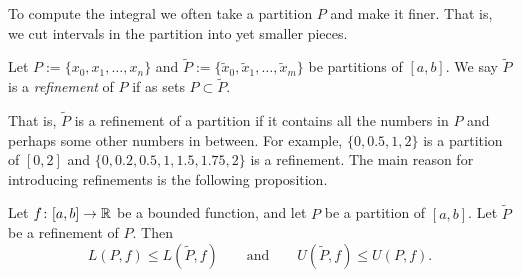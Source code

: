 To compute the integral we often take a partition $P$ and make it finer.
That is, we cut intervals in the partition into yet smaller pieces.

\begin{defn}
Let $P := \{ x_0, x_1, \ldots, x_n \}$ and
$\widetilde{P} := \{ \widetilde{x}_0, \widetilde{x}_1, \ldots, \widetilde{x}_m \}$ be
partitions of $[a,b]$.  We say $\widetilde{P}$ is a
\emph{refinement} of $P$
if as sets $P \subset \widetilde{P}$.
\end{defn}

That is, $\widetilde{P}$ is a refinement of a partition if it contains all the
numbers in $P$ and perhaps some other numbers in between.  For example,
$\{ 0, 0.5, 1, 2 \}$ is a partition of $[0,2]$ and
$\{ 0, 0.2, 0.5, 1, 1.5, 1.75, 2 \}$ is a refinement.
The main reason for introducing refinements is the following proposition.

\begin{prop} \label{prop:refinement}
Let $f \colon [a,b] \to {\mathbb{R}}$ be a bounded function, and let $P$
be a partition of $[a,b]$.  Let $\widetilde{P}$ be a refinement of $P$.
Then
\begin{equation*}
L(P,f) \leq L(\widetilde{P},f) 
\qquad \text{and} \qquad
U(\widetilde{P},f) \leq U(P,f) .
\end{equation*}
\end{prop}


